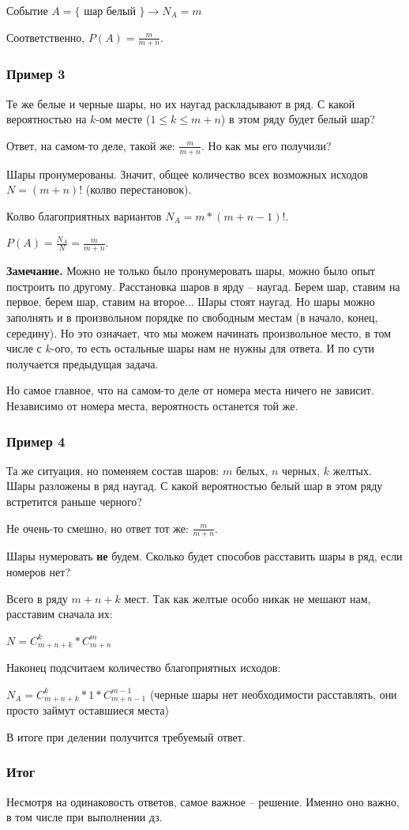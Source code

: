 \documentclass{article}
\begin{document}
Событие $A = \{$ шар белый $\} \rightarrow N_A = m$

Соответственно, $P(A) = \frac{m}{m + n}$.

\subsubsection{Пример 3}

Те же белые и черные шары, но их наугад раскладывают в ряд. С какой вероятностью на $k$-ом месте ($1 \leq k \leq m + n$) в этом ряду будет белый шар?

Ответ, на самом-то деле, такой же: $\frac{m}{m + n}$. Но как мы его получили?

Шары пронумерованы. Значит, общее количество всех возможных исходов $N = (m + n)!$ (колво перестановок).

Колво благоприятных вариантов $N_A = m * (m + n - 1)!$.

$P(A) = \frac{N_A}{N} = \frac{m}{m + n}$.

\textbf{Замечание.} Можно не только было пронумеровать шары, можно было опыт построить по другому. Расстановка шаров в ярду -- наугад. Берем шар, ставим на первое, берем шар, ставим на второе... Шары стоят наугад. Но шары можно заполнять и в произвольном порядке по свободным местам (в начало, конец, середину). Но это означает, что мы можем начинать произвольное место, в том числе с $k$-ого, то есть остальные шары нам не нужны для ответа. И по сути получается предыдущая задача.

Но самое главное, что на самом-то деле от номера места ничего не зависит. Независимо от номера места, вероятность останется той же.

\subsubsection{Пример 4}

Та же ситуация, но поменяем состав шаров: $m$ белых, $n$ черных, $k$ желтых. Шары разложены в ряд наугад. С какой вероятностью белый шар в этом ряду встретится раньше черного?

Не очень-то смешно, но ответ тот же: $\frac{m}{m + n}$.

Шары нумеровать \textbf{не} будем. Сколько будет способов расставить шары в ряд, если номеров нет?

Всего в ряду $m + n + k$ мест. Так как желтые особо никак не мешают нам, расставим сначала их:

$N = C_{m + n + k}^k * C_{m + n}^m$

Наконец подсчитаем количество благоприятных исходов:

$N_A = C_{m + n + k}^k * 1 * C_{m + n - 1}^{m - 1}$ (черные шары нет необходимости расставлять, они просто займут оставшиеся места)

В итоге при делении получится требуемый ответ.

\subsubsection{Итог}

Несмотря на одинаковость ответов, самое важное -- решение. Именно оно важно, в том числе при выполнении дз.
\end{document}

